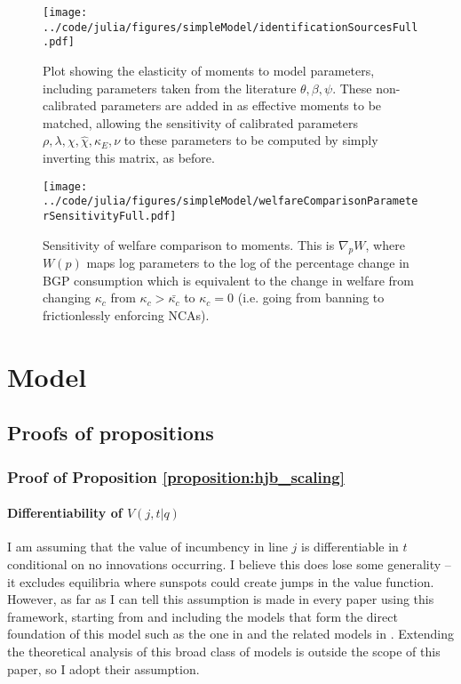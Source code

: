 \documentclass[11pt,english]{article}
\begin{document}
\begin{figure}[]
	\texttt{[image: ../code/julia/figures/simpleModel/identificationSourcesFull.pdf]}
	\caption{Plot showing the elasticity of moments to model parameters, including parameters taken from the literature $\theta , \beta, \psi$. These non-calibrated parameters are added in as effective moments to be matched, allowing the sensitivity of calibrated parameters $\rho, \lambda, \chi, \hat{\chi}, \kappa_E, \nu$ to these parameters to be computed by simply inverting this matrix, as before.}
	\label{calibration_identificationSources_full}
\end{figure}

\begin{figure}[]
	\texttt{[image: ../code/julia/figures/simpleModel/welfareComparisonParameterSensitivityFull.pdf]}
	\caption{Sensitivity of welfare comparison to moments. This is $\nabla_p W$, where $W(p)$ maps log parameters to the log of the percentage change in BGP consumption which is equivalent to the change in welfare from changing $\kappa_c$ from $\kappa_c > \bar{\kappa_c}$ to $\kappa_c = 0$ (i.e. going from banning to frictionlessly enforcing NCAs).}
	\label{welfareComparisonParameterSensitivityFull}
\end{figure}


\section{Model}\label{appendix:model}

\subsection{Proofs of propositions}

\subsubsection{Proof of Proposition \ref{proposition:hjb_scaling}}\label{appendix:proofs:proposition:hjb_scaling}

\paragraph{Differentiability of $V(j,t|q)$}

I am assuming that the value of incumbency in line $j$ is differentiable in $t$ conditional on no innovations occurring. I believe this does lose some generality -- it excludes equilibria where sunspots could create jumps in the value function. However, as far as I can tell this assumption is made in every paper using this framework, starting from \cite{grossman_quality_1991} and including the models that form the direct foundation of this model such as the one in \cite{acemoglu_innovation_2015} and the related models in \cite{acemoglu_introduction_2009}. Extending the theoretical analysis of this broad class of models is outside the scope of this paper, so I adopt their assumption. 
\end{document}
